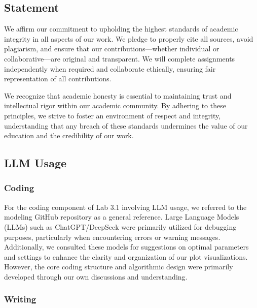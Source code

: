 \documentclass[11pt,letterpaper]{article}
\begin{document}
\vspace{1em} %
\subsection{Statement}
\vspace{0.5em} %

We affirm our commitment to upholding the highest standards of academic integrity in all aspects of our work. We pledge to properly cite all sources, avoid plagiarism, and ensure that our contributions—whether individual or collaborative—are original and transparent. We will complete assignments independently when required and collaborate ethically, ensuring fair representation of all contributions.

We recognize that academic honesty is essential to maintaining trust and intellectual rigor within our academic community. By adhering to these principles, we strive to foster an environment of respect and integrity, understanding that any breach of these standards undermines the value of our education and the credibility of our work.


\vspace{1em} %
\subsection{LLM Usage}
\vspace{0.5em} %

\subsubsection*{Coding}
\vspace{0.5em} %

For the coding component of Lab 3.1 involving LLM usage, we referred to the modeling GitHub repository as a general reference. Large Language Models (LLMs) such as ChatGPT/DeepSeek were primarily utilized for debugging purposes, particularly when encountering errors or warning messages. Additionally, we consulted these models for suggestions on optimal parameters and settings to enhance the clarity and organization of our plot visualizations. However, the core coding structure and algorithmic design were primarily developed through our own discussions and understanding.

\vspace{1em} %
\subsubsection*{Writing}
\vspace{0.5em} %
\end{document}
